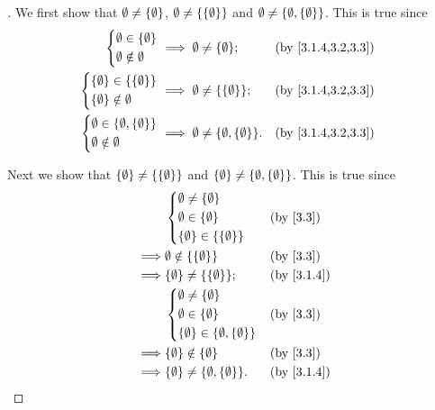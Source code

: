 \begin{proof}[]
  We first show that \(\emptyset \neq \left\lbrace\emptyset\right\rbrace\), \(\emptyset \neq \left\lbrace\left\lbrace\emptyset\right\rbrace\right\rbrace\) and \(\emptyset \neq \left\lbrace\emptyset, \left\lbrace\emptyset\right\rbrace\right\rbrace\).
  This is true since
  \begin{align*}
    \begin{dcases}
      \emptyset \in \set{\emptyset} \\
      \emptyset \notin \emptyset
    \end{dcases}                          & \implies \emptyset \neq \set{\emptyset};                  &  & \by{3.1.4,3.2,3.3} \\
    \begin{dcases}
      \set{\emptyset} \in \set{\set{\emptyset}} \\
      \set{\emptyset} \notin \emptyset
    \end{dcases}      & \implies \emptyset \neq \set{\set{\emptyset}};            &  & \by{3.1.4,3.2,3.3}                     \\
    \begin{dcases}
      \emptyset \in \set{\emptyset, \set{\emptyset}} \\
      \emptyset \notin \emptyset
    \end{dcases} & \implies \emptyset \neq \set{\emptyset, \set{\emptyset}}. &  & \by{3.1.4,3.2,3.3}
  \end{align*}

  Next we show that \(\left\lbrace\emptyset\right\rbrace \neq \left\lbrace\left\lbrace\emptyset\right\rbrace\right\rbrace\) and \(\left\lbrace\emptyset\right\rbrace \neq \left\lbrace\emptyset, \left\lbrace\emptyset\right\rbrace\right\rbrace\).
  This is true since
  \begin{align*}
             & \begin{dcases}
                 \emptyset \neq \set{\emptyset} \\
                 \emptyset \in \set{\emptyset}  \\
                 \set{\emptyset} \in \set{\set{\emptyset}}
               \end{dcases}            &  & \by{3.3}                             \\
    \implies & \emptyset \notin \set{\set{\emptyset}}                       &  & \by{3.3}   \\
    \implies & \set{\emptyset} \neq \set{\set{\emptyset}};                  &  & \by{3.1.4} \\
             & \begin{dcases}
                 \emptyset \neq \set{\emptyset} \\
                 \emptyset \in \set{\emptyset}  \\
                 \set{\emptyset} \in \set{\emptyset, \set{\emptyset}}
               \end{dcases} &  & \by{3.3}                  \\
    \implies & \set{\emptyset} \notin \set{\emptyset}                       &  & \by{3.3}   \\
    \implies & \set{\emptyset} \neq \set{\emptyset, \set{\emptyset}}.       &  & \by{3.1.4}
  \end{align*}


\end{proof}
